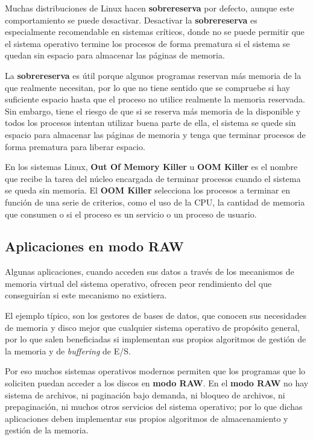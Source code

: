 Muchas distribuciones de Linux hacen \textbf{sobrereserva} por defecto,
aunque este comportamiento se puede desactivar. Desactivar la
\textbf{sobrereserva} es especialmente recomendable en sistemas
críticos, donde no se puede permitir que el sistema operativo termine
los procesos de forma prematura si el sistema se quedan sin espacio para
almacenar las páginas de memoria.

La \textbf{sobrereserva} es útil porque algunos programas reservan más
memoria de la que realmente necesitan, por lo que no tiene sentido que
se compruebe si hay suficiente espacio hasta que el proceso no utilice
realmente la memoria reservada. Sin embargo, tiene el riesgo de que si
se reserva más memoria de la disponible y todos los procesos intentan
utilizar buena parte de ella, el sistema se quede sin espacio para
almacenar las páginas de memoria y tenga que terminar procesos de forma
prematura para liberar espacio.

En los sistemas Linux, \textbf{{}Out Of Memory Killer} u \textbf{{}OOM
Killer} es el nombre que recibe la tarea del núcleo encargada de
terminar procesos cuando el sistema se queda sin memoria. El \textbf{OOM
Killer} selecciona los procesos a terminar en función de una serie de
criterios, como el uso de la CPU, la cantidad de memoria que consumen o
si el proceso es un servicio o un proceso de usuario.

\subsection{Aplicaciones en modo RAW}\label{_aplicaciones_en_modo_raw}

Algunas aplicaciones, cuando acceden sus datos a través de los
mecanismos de memoria virtual del sistema operativo, ofrecen peor
rendimiento del que conseguirían si este mecanismo no existiera.

El ejemplo típico, son los gestores de bases de datos, que conocen sus
necesidades de memoria y disco mejor que cualquier sistema operativo de
propósito general, por lo que salen beneficiadas si implementan sus
propios algoritmos de gestión de la memoria y de \emph{buffering} de
E/S.

Por eso muchos sistemas operativos modernos permiten que los programas
que lo soliciten puedan acceder a los discos en \textbf{modo RAW}. En el
\textbf{modo RAW} no hay sistema de archivos, ni paginación bajo
demanda, ni bloqueo de archivos, ni prepaginación, ni muchos otros
servicios del sistema operativo; por lo que dichas aplicaciones deben
implementar sus propios algoritmos de almacenamiento y gestión de la
memoria.

